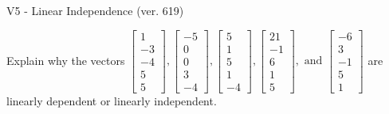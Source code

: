 \begin{exercise}
  \begin{exerciseTitle}V5 - Linear Independence (ver. 619)\end{exerciseTitle}
  \begin{exerciseStatement}
    Explain why the vectors \(\left[\begin{array}{r}
1 \\
-3 \\
-4 \\
5 \\
5
\end{array}\right] , \left[\begin{array}{r}
-5 \\
0 \\
0 \\
3 \\
-4
\end{array}\right] , \left[\begin{array}{r}
5 \\
1 \\
5 \\
1 \\
-4
\end{array}\right] , \left[\begin{array}{r}
21 \\
-1 \\
6 \\
1 \\
5
\end{array}\right] , \text{ and } \left[\begin{array}{r}
-6 \\
3 \\
-1 \\
5 \\
1
\end{array}\right]\) are linearly dependent or linearly independent.	



\end{exerciseStatement}
\end{exercise}
